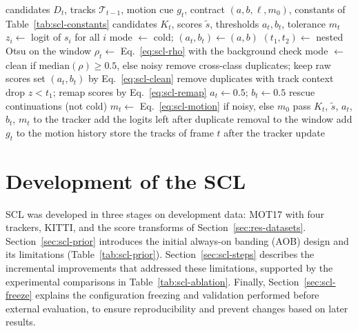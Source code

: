 \begin{algorithm}[tbp]
\caption{SCL for frame $t$; the comments name the steps of Fig.~\ref{fig:scl-arch}. The window holds the logits of frames $t-W$ to $t-1$, so the decision for frame $t$ uses no future frame.}\label{alg:scl-layer}
\begin{algorithmic}[1]
\Require candidates $D_t$, tracks $\mathcal{T}_{t-1}$, motion cue $g_t$, contract $(a,b,\ell,m_0)$, constants of Table~\ref{tab:scl-constants}
\Ensure candidates $K_t$, scores $\tilde{s}$, thresholds $a_t,b_t$, tolerance $m_t$
\State $z_i\gets$ logit of $s_i$ for all $i$ 
 
  \State mode $\gets$ cold; $(a_t,b_t)\gets(a,b)$
\Else
  \State $(t_1,t_2)\gets$ nested Otsu on the window 
  \State $\rho_t\gets$ Eq.~\eqref{eq:scl-rho} with the background check
  \State mode $\gets$ clean if $\mathrm{median}(\rho)\ge0.5$, else noisy 
\EndIf
{} 
  \State remove cross-class duplicates; keep raw scores
   set $(a_t,b_t)$ by Eq.~\eqref{eq:scl-clean}
  \EndIf
\Else {}
  \State remove duplicates with track context
  \State drop $z<t_1$; remap scores by Eq.~\eqref{eq:scl-remap}
  \State $a_t\gets0.5$; $b_t\gets0.5$
\EndIf
\State rescue continuations (not cold) 
\State $m_t\gets$ Eq.~\eqref{eq:scl-motion} if noisy, else $m_0$ 
\State pass $K_t$, $\tilde{s}$, $a_t$, $b_t$, $m_t$ to the tracker
\State add the logits left after duplicate removal to the window
\State add $g_t$ to the motion history
\State store the tracks of frame $t$ after the tracker update
\end{algorithmic}
\end{algorithm}

\section{Development of the SCL}\label{sec:scl-dev}
SCL was developed in three stages on development data: MOT17 with four trackers, KITTI, and the score transforms of Section~\ref{sec:res-datasets}. Section~\ref{sec:scl-prior} introduces the initial always-on banding (AOB) design and its limitations (Table~\ref{tab:scl-prior}). Section~\ref{sec:scl-steps} describes the incremental improvements that addressed these limitations, supported by the experimental comparisons in Table~\ref{tab:scl-ablation}. Finally, Section~\ref{sec:scl-freeze} explains the configuration freezing and validation performed before external evaluation, to ensure reproducibility and prevent changes based on later results.


